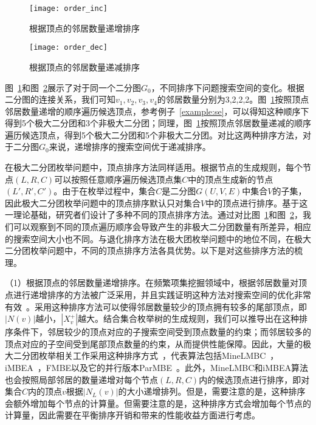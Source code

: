 \begin{figure} [H]
  \center
    \vspace{0.1in}
		\texttt{[image: order\_inc]}
    \vspace{0.05in}
	\caption{根据顶点的邻居数量递增排序}
	\label{fig:order_inc}
\end{figure}


\begin{figure} [H]
  \center
  \vspace{0.1in}
    \texttt{[image: order\_dec]}
    \vspace{0.05in}
  \caption{根据顶点的邻居数量递减排序}
	\label{fig:order_dec}
\end{figure}

\begin{example}
  图~\ref{fig:order_inc}和图~\ref{fig:order_dec}展示了对于同一个二分图$G_0$，不同排序下问题搜索空间的变化。根据二分图的连接关系，我们可知$v_1,v_2,v_3,v_4$的邻居数量分别为3,2,2,2。图~\ref{fig:order_inc}按照顶点邻居数量递增的顺序遍历候选顶点，参考例子~\ref{example:se}，可以得知这种顺序下得到5个极大二分团和3个非极大二分团；同理，图~\ref{fig:order_inc}按照顶点邻居数量递减的顺序遍历候选顶点，得到5个极大二分团和5个非极大二分团。对比这两种排序方法，对于二分图$G_0$来说，递增排序的搜索空间优于递减排序。
\end{example}




在极大二分团枚举问题中，顶点排序方法同样适用。根据节点的生成规则，每个节点$(L,R,C)$可以按照任意顺序遍历候选顶点集$C$中的顶点生成新的节点$(L',R',C')$。由于在枚举过程中，集合$C$是二分图$G(U,V,E)$中集合$V$的子集，因此极大二分团枚举问题中的顶点排序默认只对集合$V$中的顶点进行排序。基于这一理论基础，研究者们设计了多种不同的顶点排序方法。通过对比图~\ref{fig:order_inc}和图~\ref{fig:order_dec}，我们可以观察到不同的顶点遍历顺序会导致产生的非极大二分团数量有所差异，相应的搜索空间大小也不同。与退化排序方法在极大团枚举问题中的地位不同，在极大二分团枚举问题中，不同的顶点排序方法各具优势。以下是对这些排序方法的梳理。

（1）根据顶点的邻居数量递增排序。在频繁项集挖掘领域中，根据邻居数量对顶点进行递增排序的方法被广泛采用，并且实践证明这种方法对搜索空间的优化非常有效~\cite{lcm04}。采用这种排序方法可以使得邻居数量较少的顶点拥有较多的尾部顶点，即$|N(v)|$越小，$|X_v^+|$越大。结合集合枚举树的生成规则，我们可以推导出在这种排序条件下，邻居较少的顶点对应的子搜索空间受到顶点数量的约束；而邻居较多的顶点对应的子空间受到尾部顶点数量的约束，从而提供性能保障。因此，大量的极大二分团枚举相关工作采用这种排序方式~\cite{lcmmbc07,minel06,iMBEA14,mapreduceMBE16,parMBE18,MEB20}，代表算法包括MineLMBC~\cite{minel06}，iMBEA~\cite{iMBEA14}，FMBE以及它的并行版本ParMBE~\cite{parMBE18}。此外，MineLMBC和iMBEA算法也会按照局部邻居的数量递增对每个节点$(L,R,C)$内的候选顶点进行排序，即对集合$C$内的顶点$v$根据$|N_L(v)|$的大小递增排列。但是，需要注意的是，这种排序会额外增加每个节点的计算量。但需要注意的是，这种排序方式会增加每个节点的计算量，因此需要在平衡排序开销和带来的性能收益方面进行考虑。

